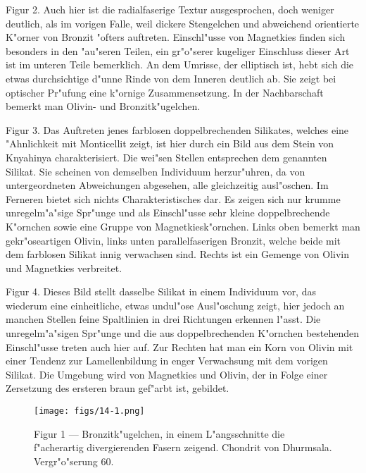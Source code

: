 \documentclass[a4paper, 11pt, oneside, polutonikogreek, german]{article}
\begin{document}
Figur 2. Auch hier ist die radialfaserige Textur ausgesprochen, doch weniger deutlich, als im vorigen Falle, weil dickere Stengelchen und abweichend orientierte K"orner von Bronzit "ofters auftreten. Einschl"usse von Magnetkies finden sich besonders in den "au"seren Teilen, ein gr"o"serer kugeliger Einschluss dieser Art ist im unteren Teile bemerklich. An dem Umrisse, der elliptisch ist, hebt sich die etwas durchsichtige d"unne Rinde von dem Inneren deutlich ab. Sie zeigt bei optischer Pr"ufung eine k"ornige Zusammensetzung. In der Nachbarschaft bemerkt man Olivin- und Bronzitk"ugelchen.

Figur 3. Das Auftreten jenes farblosen doppelbrechenden Silikates, welches eine "Ahnlichkeit mit Monticellit zeigt, ist hier durch ein Bild aus dem Stein von Knyahinya charakterisiert. Die wei"sen Stellen entsprechen dem genannten Silikat. Sie scheinen von demselben Individuum herzur"uhren, da von untergeordneten Abweichungen abgesehen, alle gleichzeitig ausl"oschen. Im Ferneren bietet sich nichts Charakteristisches dar. Es zeigen sich nur krumme unregelm"a"sige Spr"unge und als Einschl"usse sehr kleine doppelbrechende K"ornchen sowie eine Gruppe von Magnetkiesk"ornchen. Links oben bemerkt man gekr"oseartigen Olivin, links unten parallelfaserigen Bronzit, welche beide mit dem farblosen Silikat innig verwachsen sind. Rechts ist ein Gemenge von Olivin und Magnetkies verbreitet.

Figur 4. Dieses Bild stellt dasselbe Silikat in einem Individuum vor, das wiederum eine einheitliche, etwas undul"ose Ausl"oschung zeigt, hier jedoch an manchen Stellen feine Spaltlinien in drei Richtungen erkennen l"asst. Die unregelm"a"sigen Spr"unge und die aus doppelbrechenden K"ornchen bestehenden Einschl"usse treten auch hier auf. Zur Rechten hat man ein Korn von Olivin mit einer Tendenz zur Lamellenbildung in enger Verwachsung mit dem vorigen Silikat. Die Umgebung wird von Magnetkies und Olivin, der in Folge einer Zersetzung des ersteren braun gef"arbt ist, gebildet.
\clearpage

\vspace*{\fill}
\begin{figure}[H]
\centering
\texttt{[image: figs/14-1.png]}
\caption{\small Figur 1 --- Bronzitk"ugelchen, in einem L"angsschnitte die f"acherartig divergierenden Fasern zeigend. Chondrit von Dhurmsala. Vergr"o"serung 60.}
\end{figure}
\vspace*{\fill}
\clearpage
\end{document}
